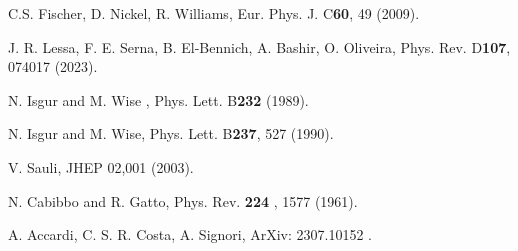\documentclass[aps,prd,superscriptaddress,eqsecnum,amsfonts,showpacs,epsfig]{revtex4}
\begin{document}
\begin{thebibliography}{00}
C.S. Fischer, D. Nickel, R. Williams, Eur. Phys. J. C{\bf 60}, 49 (2009).

 J. R. Lessa, F. E. Serna, B. El-Bennich, A. Bashir, O. Oliveira, Phys. Rev. D{\bf  107}, 074017 (2023).

N. Isgur and M. Wise , Phys. Lett.  B{\bf 232} (1989). 

N. Isgur and M. Wise, Phys. Lett. B{\bf 237}, 527 (1990). 

V. Sauli, JHEP 02,001 (2003).

N. Cabibbo and R. Gatto, Phys. Rev. {\bf 224} , 1577 (1961).

 A. Accardi, C. S. R. Costa, A. Signori, ArXiv: 2307.10152 .

\end{thebibliography}
%
\end{document}
